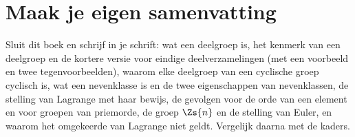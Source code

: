 \begin{oefeningen}


\end{oefeningen}


\begin{oefeningen}






\end{oefeningen}


\ifzelfstudie
\section*{Maak je eigen samenvatting}
Sluit dit boek en schrijf in je schrift: wat een deelgroep is, het kenmerk van een deelgroep en de kortere versie voor eindige deelverzamelingen (met een voorbeeld en twee tegenvoorbeelden), waarom elke deelgroep van een cyclische groep cyclisch is, wat een nevenklasse is en de twee eigenschappen van nevenklassen, de stelling van Lagrange met haar bewijs, de gevolgen voor de orde van een element en voor groepen van priemorde, de groep $\Zs{n}$ en de stelling van Euler, en waarom het omgekeerde van Lagrange niet geldt. Vergelijk daarna met de kaders.
\fi
